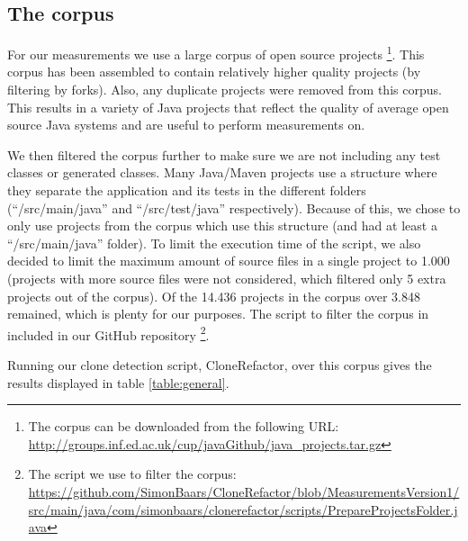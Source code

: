 \documentclass[a4paper]{article}
\begin{document}
\subsection{The corpus}\label{chap:corpus}
For our measurements we use a large corpus of open source projects \cite{githubCorpus2013}\footnote{The corpus can be downloaded from the following URL: \url{http://groups.inf.ed.ac.uk/cup/javaGithub/java_projects.tar.gz}}. This corpus has been assembled to contain relatively higher quality projects (by filtering by forks). Also, any duplicate projects were removed from this corpus. This results in a variety of Java projects that reflect the quality of average open source Java systems and are useful to perform measurements on.

We then filtered the corpus further to make sure we are not including any test classes or generated classes. Many Java/Maven projects use a structure where they separate the application and its tests in the different folders (``/src/main/java'' and ``/src/test/java'' respectively). Because of this, we chose to only use projects from the corpus which use this structure (and had at least a ``/src/main/java'' folder). To limit the execution time of the script, we also decided to limit the maximum amount of source files in a single project to 1.000 (projects with more source files were not considered, which filtered only 5 extra projects out of the corpus). Of the 14.436 projects in the corpus over 3.848 remained, which is plenty for our purposes. The script to filter the corpus in included in our GitHub repository \footnote{The script we use to filter the corpus: \url{https://github.com/SimonBaars/CloneRefactor/blob/MeasurementsVersion1/src/main/java/com/simonbaars/clonerefactor/scripts/PrepareProjectsFolder.java}}.

Running our clone detection script, CloneRefactor, over this corpus gives the results displayed in table \ref{table:general}.
\end{document}
